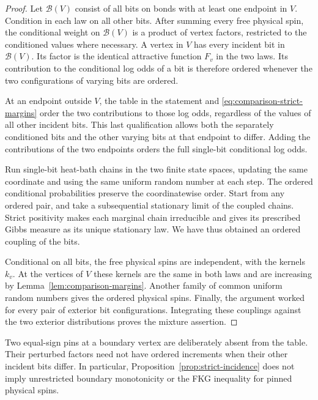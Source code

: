 \begin{proof}
Let \(\mathcal B(V)\) consist of all bits on bonds with at least one
endpoint in \(V\).  Condition in each law on all other bits.  After
summing every free physical spin, the conditional weight on
\(\mathcal B(V)\) is a product of vertex factors, restricted to the
conditioned values where necessary.  A vertex in \(V\) has every
incident bit in \(\mathcal B(V)\).  Its factor is the identical
attractive function \(F_v\) in the two laws.  Its contribution to the
conditional log odds of a bit is therefore ordered whenever the two
configurations of varying bits are ordered.

At an endpoint outside \(V\), the table in the statement and
\eqref{eq:comparison-strict-margins} order the two contributions to those
log odds, regardless of the values of all other incident bits.  This
last qualification allows both the separately conditioned bits and the
other varying bits at that endpoint to differ.  Adding the contributions
of the two endpoints orders the full single-bit conditional log odds.

Run single-bit heat-bath chains in the two finite state spaces, updating
the same coordinate and using the same uniform random number at each
step.  The ordered conditional probabilities preserve the coordinatewise
order.  Start from any ordered pair, and take a subsequential stationary
limit of the coupled chains.  Strict positivity makes each marginal
chain irreducible and gives its prescribed Gibbs measure as its unique
stationary law.  We have thus obtained an ordered coupling of the bits.

Conditional on all bits, the free physical spins are independent, with
the kernels \(k_v\).  At the vertices of \(V\) these kernels are the
same in both laws and are increasing by
Lemma~\ref{lem:comparison-margins}.  Another family of common uniform
random numbers gives the ordered physical spins.  Finally, the argument
worked for every pair of exterior bit configurations.  Integrating these
couplings against the two exterior distributions proves the mixture
assertion.
\end{proof}

Two equal-sign pins at a boundary vertex are deliberately absent from
the table.  Their perturbed factors need not have ordered increments
when their other incident bits differ.  In particular,
Proposition~\ref{prop:strict-incidence} does not imply unrestricted
boundary monotonicity or the FKG inequality for pinned physical spins.

